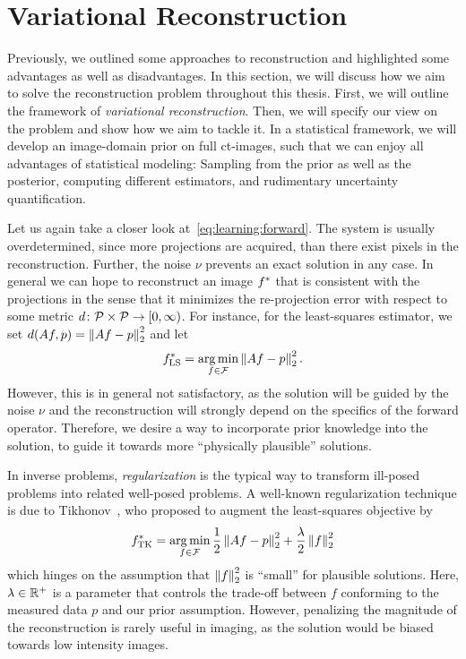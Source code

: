 \documentclass[../ml-ct.tex]{subfiles}
\begin{document}
\section{Variational Reconstruction}
Previously, we outlined some approaches to reconstruction and highlighted some advantages as well as disadvantages.
In this section, we will discuss how we aim to solve the reconstruction problem throughout this thesis.
First, we will outline the framework of \emph{variational reconstruction}.
Then, we will specify our view on the problem and show how we aim to tackle it.
In a statistical framework, we will develop an image-domain prior on full \gls{ct}-images, such that we can enjoy all advantages of statistical modeling: Sampling from the prior as well as the posterior, computing different estimators, and rudimentary uncertainty quantification.

Let us again take a closer look at~\cref{eq:learning:forward}.
The system is usually overdetermined, since more projections are acquired, than there exist pixels in the reconstruction.
Further, the noise \( \nu \) prevents an exact solution in any case.
In general we can hope to reconstruct an image \( f^*_{\text{}} \) that is consistent with the projections in the sense that it minimizes the re-projection error with respect to some metric \( d\colon\mathcal{P}\times\mathcal{P}\to[0, \infty)\). %
For instance, for the least-squares estimator, we set \( d(Af, p) = \left\lVert Af - p\right\rVert_2^2 \) and let
\begin{equation}
	f^*_{\text{LS}} = \operatorname*{arg\,min}_{f \in \mathcal{F}} \left\lVert Af - p\right\rVert_2^2.
\end{equation}
However, this is in general not satisfactory, as the solution will be guided by the noise \( \nu \) and the reconstruction will strongly depend on the specifics of the forward operator.
Therefore, we desire a way to incorporate prior knowledge into the solution, to guide it towards more \enquote{physically plausible} solutions.

In inverse problems, \emph{regularization} is the typical way to transform ill-posed problems into related well-posed problems.
A well-known regularization technique is due to Tikhonov~\cite{tikhonov_solution_1963}, who proposed to augment the least-squares objective by
\begin{equation}
	\optimal{f}{TK} = \argmin_{f \in \set{F}} \frac{1}{2}\norm{Af - p}_2^2 + \frac{\lambda}{2}\norm{f}_2^2%
	\label{eq:learning:tikhonov}
\end{equation}
which hinges on the assumption that \( \left\lVert f\right\rVert_2^2 \) is \enquote{small} for plausible solutions.
Here, \( \lambda \in \mathbb{R}^+ \) is a parameter that controls the trade-off between \( f \) conforming to the measured data \( p \) and our prior assumption.
However, penalizing the magnitude of the reconstruction is rarely useful in imaging, as the solution would be biased towards low intensity images.
\end{document}

